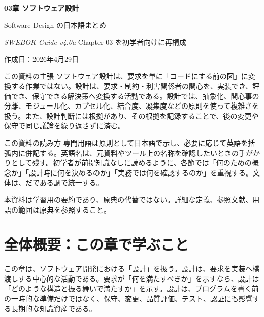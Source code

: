 \documentclass[10.5pt,a4paper]{ltjsarticle}
\newcommand{\swebok}{\textit{SWEBOK Guide v4.0a}}
\begin{document}
\begin{titlepage}
  \vspace*{6mm}
  {\Huge\bfseries 03章 ソフトウェア設計}\par
  \vspace{3mm}
  {\Large Software Design の日本語まとめ}\par
  \vspace{3mm}
  {\normalsize \swebok{} Chapter 03 を初学者向けに再構成}\par
  \vspace{3mm}
  {\normalsize 作成日：2026年4月29日}\par

  \vspace{8mm}
  \begin{pointbox}{この資料の主張}
  ソフトウェア設計は、要求を単に「コードにする前の図」に変換する作業ではない。設計は、要求・制約・利害関係者の関心を、実装でき、評価でき、保守できる解決策へ変換する活動である。設計では、抽象化、関心事の分離、モジュール化、カプセル化、結合度、凝集度などの原則を使って複雑さを扱う。また、設計判断には根拠があり、その根拠を記録することで、後の変更や保守で同じ議論を繰り返さずに済む。
  \end{pointbox}

  \begin{pointbox}{この資料の読み方}
  専門用語は原則として日本語で示し、必要に応じて英語を括弧内に併記する。英語名は、元資料やツール上の名称を確認したいときの手がかりとして残す。初学者が前提知識なしに読めるように、各節では「何のための概念か」「設計時に何を決めるのか」「実務では何を確認するのか」を重視する。文体は、だである調で統一する。
  \end{pointbox}

  \vfill
  {\small 本資料は学習用の要約であり、原典の代替ではない。詳細な定義、参照文献、用語の範囲は原典を参照すること。}
\end{titlepage}

\tableofcontents
\newpage

\section*{全体概要：この章で学ぶこと}

この章は、ソフトウェア開発における「設計」を扱う。設計は、要求を実装へ橋渡しする中心的な活動である。要求が「何を満たすべきか」を示すなら、設計は「どのような構造と振る舞いで満たすか」を示す。設計は、プログラムを書く前の一時的な準備だけではなく、保守、変更、品質評価、テスト、認証にも影響する長期的な知識資産である。
\end{document}
